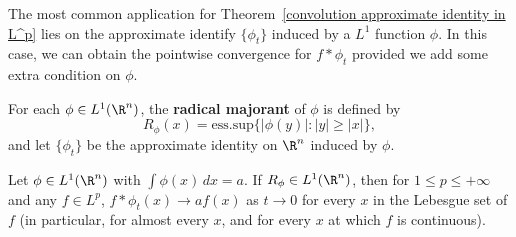 The most common application for Theorem~\ref{convolution approximate identity in L^p} lies on the approximate identify $\{\phi_t\}$ induced by a $L^1$ function $\phi$. In this case, we can obtain the pointwise convergence for $f\ast\phi_t$ provided we add some extra condition on $\phi$.
\begin{definition}
For each $\phi\in L^1(\R^n)$, the \textbf{radical majorant} of $\phi$ is defined by
\[R_\phi(x)=\mathrm{ess.sup}\{|\phi(y)|:|y|\geq|x|\},\]
and let $\{\phi_t\}$ be the approximate identity on $\R^n$ induced by $\phi$.
\end{definition}
\begin{theorem}\label{convolution approximate identity a.e.}
Let $\phi\in L^1(\R^n)$ with $\int\phi(x)\,dx=a$. If $R_\phi\in L^1(\R^n)$, then for $1\leq p\leq+\infty$ and any $f\in L^p$, $f\ast\phi_t(x)\to af(x)$ as $t\to 0$ for every $x$ in the Lebesgue set of $f$ (in particular, for almost every $x$, and for every $x$ at which $f$ is continuous).
\end{theorem}
